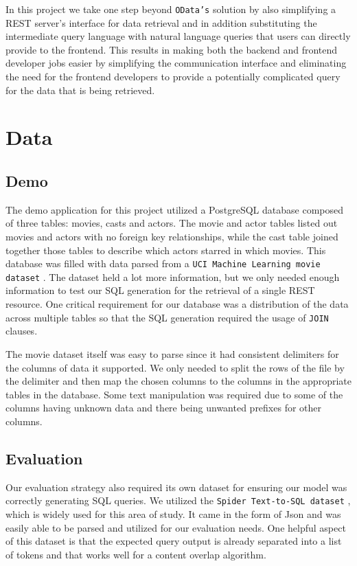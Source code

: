 \documentclass[11pt]{article}
\begin{document}
In this project we take one step beyond \texttt{OData's} solution by also simplifying a REST server's interface for data retrieval and in addition substituting the intermediate query language with natural language queries that users can directly provide to the frontend. This results in making both the backend and frontend developer jobs easier by simplifying the communication interface and eliminating the need for the frontend developers to provide a potentially complicated query for the data that is being retrieved.

\section{Data}

\subsection{Demo}

The demo application for this project utilized a PostgreSQL database composed of three tables: movies, casts and actors. The movie and actor tables listed out movies and actors with no foreign key relationships, while the cast table joined together those tables to describe which actors starred in which movies. This database was filled with data parsed from a \texttt{UCI Machine Learning movie dataset} \citep{misc_movie_132}. The dataset held a lot more information, but we only needed enough information to test our SQL generation for the retrieval of a single REST resource. One critical requirement for our database was a distribution of the data across multiple tables so that the SQL generation required the usage of \texttt{JOIN} clauses.

The movie dataset itself was easy to parse since it had consistent delimiters for the columns of data it supported. We only needed to split the rows of the file by the delimiter and then map the chosen columns to the columns in the appropriate tables in the database. Some text manipulation was required due to some of the columns having unknown data and there being unwanted prefixes for other columns.

\subsection{Evaluation}

Our evaluation strategy also required its own dataset for ensuring our model was correctly generating SQL queries. We utilized the \texttt{Spider Text-to-SQL dataset} \citep{yu2019spider}, which is widely used for this area of study. It came in the form of Json and was easily able to be parsed and utilized for our evaluation needs. One helpful aspect of this dataset is that the expected query output is already separated into a list of tokens and that works well for a content overlap algorithm.
\end{document}
